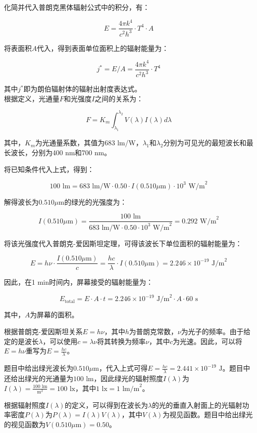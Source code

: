 \documentclass[12pt, a4paper, oneside]{article}
\begin{document}
\begin{spacing}{2.0}
化简并代入普朗克黑体辐射公式中的积分，有：

$$E=\frac{4\pi k^4}{c^2h^3}\cdot T^4\cdot A$$

将表面积$A$代入，得到表面单位面积上的辐射能量为：

$$j^*=E/A=\frac{4\pi k^4}{c^2h^3}\cdot T^4$$

其中$j^*$即为朗伯辐射体的辐射出射度表达式。\\
根据定义，光通量$F$和光强度$I$之间的关系为：

$$F = K_m \int_{\lambda_1}^{\lambda_2} V(\lambda) I(\lambda) d\lambda$$

其中，$K_m$为光通量系数，其值为683 lm/W，$\lambda_1$和$\lambda_2$分别为可见光的最短波长和最长波长，分别为400 nm和700 nm。

将已知条件代入上式，得到：

$$100 \text{ lm} = 683 \text{ lm/W} \cdot 0.50 \cdot I(0.510 \mu \text{m}) \cdot 10^3 \text{ W/m}^2$$

解得波长为$0.510 \mu \text{m}$的绿光的光强度为：

$$I(0.510 \mu \text{m}) = \frac{100 \text{ lm}}{683 \text{ lm/W} \cdot 0.50 \cdot 10^3 \text{ W/m}^2} = 0.292 \text{ W/m}^2$$

将该光强度代入普朗克-爱因斯坦定理，可得该波长下单位面积的辐射能量为：

$$E = h \nu \cdot \frac{I(0.510 \mu \text{m})}{c} = \frac{h c}{\lambda} \cdot I(0.510 \mu \text{m}) = 2.246 \times 10^{-19} \text{ J/m}^2$$

因此，在1 min时间内，屏幕接受的辐射能量为：

$$E_{\text{total}} = E \cdot A \cdot t = 2.246 \times 10^{-19} \text{ J/m}^2 \cdot A \cdot 60 \text{ s}$$

其中，$A$为屏幕的面积。

根据普朗克-爱因斯坦关系$E=h\nu$，其中$h$为普朗克常数，$\nu$为光子的频率。由于给定的是波长$\lambda$，可以使用$c=\lambda \nu$将其转换为频率$\nu$，其中$c$为光速。因此，可以将$E=h\nu$重写为$E=\frac{hc}{\lambda}$。

题目中给出绿光波长为$0.510\mu\text{m}$，代入上式可得$E=\frac{hc}{\lambda}=2.441\times10^{-19}\text{ J}$。题目中还给出绿光的光通量为$100\text{ lm}$，因此绿光的辐射照度$I(\lambda)$为$I(\lambda)=\frac{100\text{ lm}}{\text{m}^2}=100\text{ lx}$，其中$1\text{ lx}=1\text{ lm/m}^2$。

根据辐射照度$I(\lambda)$的定义，可以得到在波长为$\lambda$的光的垂直入射面上的光辐射功率密度$P(\lambda)$为$P(\lambda)=I(\lambda)V(\lambda)$，其中$V(\lambda)$为视见函数。题目中给出绿光的视见函数为$V(0.510\mu\text{m})=0.50$。


\end{spacing}
\end{document}
